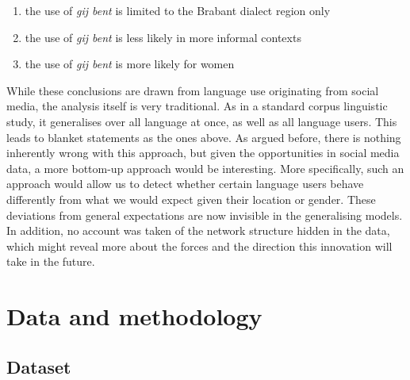 \documentclass[
  letterpaper,
  DIV=11,
  numbers=noendperiod,
  oneside]{scrartcl}
\providecommand{\tightlist}{%
  \setlength{\itemsep}{0pt}\setlength{\parskip}{0pt}}\usepackage{longtable,booktabs,array}
\begin{document}
\begin{enumerate}
\def\labelenumi{\arabic{enumi}.}
\tightlist
\item
  the use of \emph{gij bent} is limited to the Brabant dialect region
  only
\item
  the use of \emph{gij bent} is less likely in more informal contexts
\item
  the use of \emph{gij bent} is more likely for women
\end{enumerate}

While these conclusions are drawn from language use originating from
social media, the analysis itself is very traditional. As in a standard
corpus linguistic study, it generalises over all language at once, as
well as all language users. This leads to blanket statements as the ones
above. As argued before, there is nothing inherently wrong with this
approach, but given the opportunities in social media data, a more
bottom-up approach would be interesting. More specifically, such an
approach would allow us to detect whether certain language users behave
differently from what we would expect given their location or gender.
These deviations from general expectations are now invisible in the
generalising models. In addition, no account was taken of the network
structure hidden in the data, which might reveal more about the forces
and the direction this innovation will take in the future.

\section{Data and methodology}\label{data-and-methodology}

\subsection{Dataset}\label{dataset}
\end{document}
